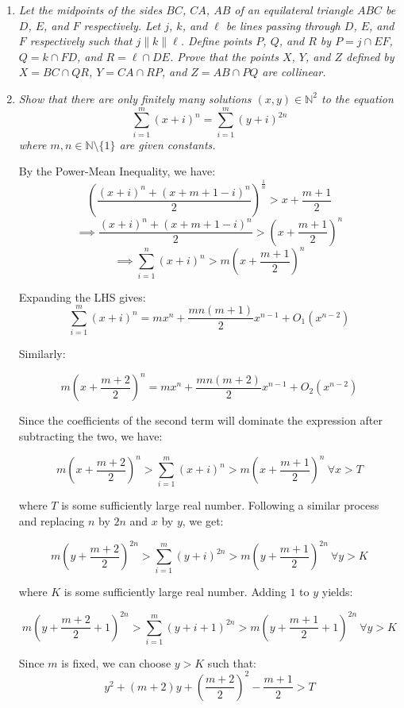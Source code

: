 \documentclass{article}
\begin{document}
\begin{enumerate}
\medskip
\item %
{\itshape Let the midpoints of the sides $BC$, $CA$, $AB$ of an equilateral triangle $ABC$ be $D$, $E$, and $F$ respectively. Let $j$, $k$, and $\ell$ be lines passing through $D$, $E$, and $F$ respectively such that $j \parallel k \parallel \ell$. Define points $P$, $Q$, and $R$ by $P = j\cap EF$, $Q = k \cap FD$, and $R = \ell \cap DE$. Prove that the points $X$, $Y$, and $Z$ defined by $X = BC \cap QR$, $Y = CA \cap RP$, and $Z = AB \cap PQ$ are  collinear.}



\medskip
\item %
{\itshape Show that there are only finitely many solutions $(x, y) \in \mathbb{N}^2$ to the equation
$$\sum_{i = 1}^{m} (x + i)^n = \sum_{i = 1}^{m} (y + i)^{2n}$$
where $m, n \in \mathbb{N} \setminus \{1\}$ are given constants.}

By the Power-Mean Inequality, we have:
$$(\frac{(x + i)^n + (x + m + 1 - i)^n}{2})^{\frac{1}{n}} > x + \frac{m + 1}{2}$$
$$\implies \frac{(x + i)^n + (x + m + 1 - i)^n}{2} > (x + \frac{m + 1}{2})^n$$
$$\implies \sum_{i = 1}^{n} (x + i)^n > m(x + \frac{m + 1}{2})^n$$

Expanding the LHS gives:
$$\sum_{i = 1}^{m} (x + i)^n = mx^n + \frac{mn(m + 1)}{2}x^{n - 1} + O_1(x^{n - 2})$$

Similarly:

$$m(x + \frac{m + 2}{2})^n = mx^n + \frac{mn(m + 2)}{2}x^{n - 1} + O_2(x^{n - 2})$$

Since the coefficients of the second term will dominate the expression after subtracting the two, we have:

$$m(x + \frac{m + 2}{2})^n > \sum_{i = 1}^{m} (x + i)^n > m(x + \frac{m + 1}{2})^n ~\forall x > T$$

where $T$ is some sufficiently large real number. Following a similar process and replacing $n$ by $2n$ and $x$ by $y$, we get:

$$m(y + \frac{m + 2}{2})^{2n} > \sum_{i = 1}^{m} (y + i)^{2n} > m(y + \frac{m + 1}{2})^{2n} ~\forall y > K$$

where $K$ is some sufficiently large real number. Adding $1$ to $y$ yields:

$$m(y + \frac{m + 2}{2} + 1)^{2n} > \sum_{i = 1}^{m} (y + i + 1)^{2n} > m(y + \frac{m + 1}{2} + 1)^{2n} ~\forall y > K$$

Since $m$ is fixed, we can choose $y > K$ such that: 
$$y^2 + (m + 2)y + (\frac{m + 2}{2})^2 - \frac{m + 1}{2} > T$$


\end{enumerate}
\end{document}
